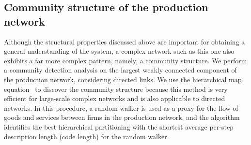 \documentclass[pre,floatfix,twocolumn,showpacs,a4paper,nofootinbib]{revtex4}
\begin{document}
\subsection{Community structure of the production network}
Although the structural properties discussed above are important for obtaining a general understanding of the system, a complex network such as this one also exhibits a far more
complex pattern, namely, a community structure. We perform a community detection analysis on the largest weakly connected component of the production network, 
considering directed links. We use the hierarchical map equation~\cite{rosvall2011multilevel} to discover the community structure because this method is very efficient for
large-scale complex networks and is also applicable to directed networks. In this procedure, a random walker is used as a proxy for 
the flow of goods and services between firms in the production network, and the algorithm identifies the best hierarchical partitioning with the shortest 
average per-step description length (code length) for the random walker. 
\end{document}
